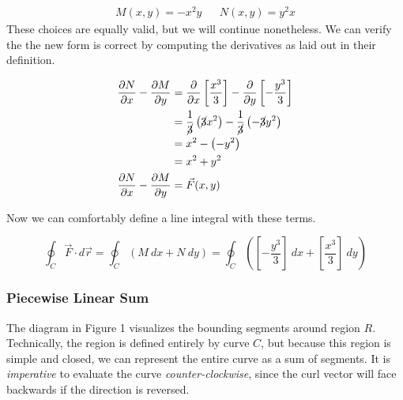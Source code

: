 \documentclass{article}
\begin{document}
\begin{equation*}
\begin{aligned}
    M(x, y) = -x^2 y && N(x, y) = y^2 x
\end{aligned}
\end{equation*}
These choices are equally valid, but we will continue nonetheless. We can verify the the new form is correct by computing the derivatives as laid out in their definition.

\begin{equation*}
\begin{aligned}
    \frac{\partial N}{\partial x} - \frac{\partial M}{\partial y} &= \frac{\partial}{\partial x}\left[\frac{x^3}{3}\right] - \frac{\partial}{\partial y}\left[-\frac{y^3}{3}\right] \\
    &= \frac{1}{\cancel{3}}\left(\cancel{3}x^2\right) - \frac{1}{\cancel{3}}\left(-\cancel{3}y^2\right) \\
    &= x^2 - \left(-y^2\right) \\
    &= x^2 + y^2 \\
    \frac{\partial N}{\partial x} - \frac{\partial M}{\partial y} &= \vec{F}(x, y)
\end{aligned}
\end{equation*}

Now we can comfortably define a line integral with these terms.

\begin{equation}
    \oint_C{\vec{F}\cdot d\vec{r}} = \oint_C{\left(M\:dx + N\:dy\right)} = \oint_C{\left(\left[-\frac{y^3}{3}\right]\:dx + \left[\frac{x^3}{3}\right]\:dy\right)}
\end{equation}

\subsubsection{Piecewise Linear Sum}

The diagram in Figure 1 visualizes the bounding segments around region $R$. Technically, the region is defined entirely by curve $C$, but because this region is simple and closed, we can represent the entire curve as a sum of segments. It is \emph{imperative} to evaluate the curve \emph{counter-clockwise}, since the curl vector will face backwards if the direction is reversed.
\end{document}
